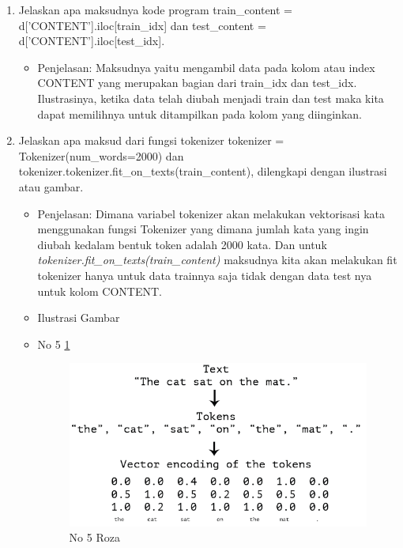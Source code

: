 \begin{enumerate}
\item Jelaskan apa maksudnya kode program {train\_content = d['CONTENT'].iloc[train\_idx]} dan {test\_content = d['CONTENT'].iloc[test\_idx]}.
\begin{itemize}
\item Penjelasan: Maksudnya yaitu mengambil data pada kolom atau index CONTENT yang merupakan bagian dari train\_idx dan test\_idx. Ilustrasinya, ketika data telah diubah menjadi train dan test maka kita dapat memilihnya untuk ditampilkan pada kolom yang diinginkan.
\par 
\par
\end{itemize}
\par
\par

\item Jelaskan apa maksud dari fungsi tokenizer {tokenizer = Tokenizer(num\_words=2000)} dan tokenizer.{tokenizer.fit\_on\_texts(train\_content)}, dilengkapi dengan ilustrasi atau gambar.
\begin{itemize}
\item Penjelasan: Dimana variabel tokenizer akan melakukan vektorisasi kata menggunakan fungsi Tokenizer yang dimana jumlah kata yang ingin diubah kedalam bentuk token adalah 2000 kata. Dan untuk \emph{tokenizer.fit\_on\_texts(train\_content)} maksudnya kita akan melakukan fit tokenizer hanya untuk data trainnya saja tidak dengan data test nya untuk kolom CONTENT. 
\par 
\par
\item Ilustrasi Gambar
\item No 5 \ref{teori5}
\begin{figure}[!hbtp]
\centering
\includegraphics[scale=0.4]{figures/teori5.png}
\caption{No 5 Roza}
\label{teori5}
\end{figure}
\par
\end{itemize}
\par
\par



\end{enumerate}
